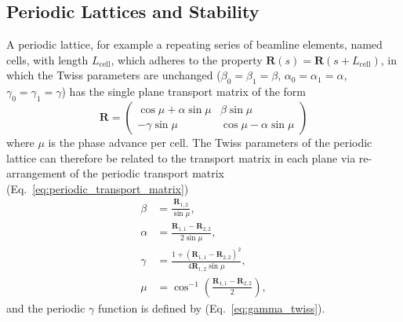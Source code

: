 \documentclass[../main.tex]{subfiles}
\begin{document}
\subsection{Periodic Lattices and Stability}

A periodic lattice, for example a repeating series of beamline elements, named cells, with length $L_{\mathrm{cell}}$, which adheres to the property $\boldsymbol{R}\left(s\right) = \boldsymbol{R}\left(s+L_{\mathrm{cell}}\right)$, in which the Twiss parameters are unchanged ($\beta_{0}=\beta_{1}=\beta$, $\alpha_{0}=\alpha_{1}=\alpha$, $\gamma_{0}=\gamma_{1}=\gamma$) has the single plane transport matrix of the form
\begin{equation}
\boldsymbol{R} =
\begin{pmatrix}
\cos\mu + \alpha\sin\mu & \beta\sin\mu \\
-\gamma\sin\mu & \cos\mu-\alpha\sin\mu
\end{pmatrix}
\label{eq:periodic_transport_matrix}    
\end{equation}
where $\mu$ is the phase advance per cell. The Twiss parameters of the periodic lattice can therefore be related to the transport matrix in each plane via re-arrangement of the periodic transport matrix (Eq.~\ref{eq:periodic_transport_matrix})
\begin{align}
\beta &= \frac{\boldsymbol{R}_{1,2}}{\sin\mu}, 
\label{eq:periodic_beta_function} \\
\alpha & = \frac{\boldsymbol{R}_{1,1}-\boldsymbol{R}_{2,2}}{2\sin\mu},
\label{eq:periodic_alpha} \\
\gamma &= \frac{1+\left(\boldsymbol{R}_{1,1}-\boldsymbol{R}_{2,2}\right)^{2}}{4\boldsymbol{R}_{1,2}\sin\mu},
\label{eq:periodic_gamma} \\
\mu &= \cos^{-1}\left(\frac{\boldsymbol{R}_{1,1}-\boldsymbol{R}_{2,2}}{2}\right),
\label{eq:periodic_phase_advance}
\end{align}
and the periodic $\gamma$ function is defined by (Eq.~\ref{eq:gamma_twiss}).
\end{document}
